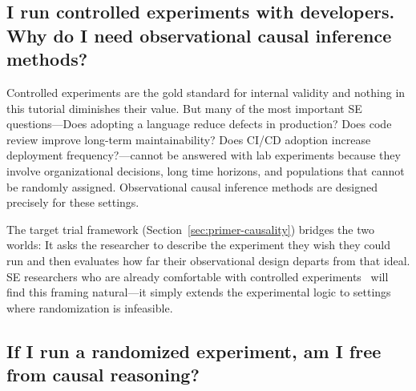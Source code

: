\subsection{I run controlled experiments with developers. Why do I need observational causal inference methods?}

Controlled experiments are the gold standard for internal validity and nothing in this tutorial diminishes their value.
But many of the most important SE questions---Does adopting a language reduce defects in production?
Does code review improve long-term maintainability?
Does CI/CD adoption increase deployment frequency?---cannot be answered with lab experiments because they involve organizational decisions, long time horizons, and populations that cannot be randomly assigned.
Observational causal inference methods are designed precisely for these settings.

The target trial framework (Section~\ref{sec:primer-causality}) bridges the two worlds: It asks the researcher to describe the experiment they wish they could run and then evaluates how far their observational design departs from that ideal.
SE researchers who are already comfortable with controlled experiments~\cite{DBLP:books/sp/WohlinRHORW24} will find this framing natural---it simply extends the experimental logic to settings where randomization is infeasible.

\subsection{If I run a randomized experiment, am I free from causal reasoning?}

